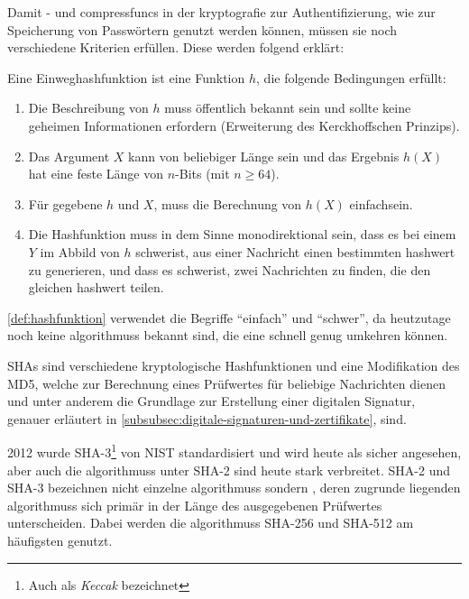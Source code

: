 Damit - und \glspl{compressfunc} in der \gls{kryptografie} zur Authentifizierung, wie \zb zur Speicherung von Passwörtern genutzt werden können, müssen sie noch verschiedene Kriterien erfüllen.
Diese werden folgend erklärt:

\begin{definition}[label=def:hashfunktion]
    Eine Einweghashfunktion ist eine Funktion $h$, die folgende Bedingungen erfüllt\autocite[\vglf][\pagef~17]{anal-des-hash-function-2003}:
    \begin{enumerate}
        \item Die Beschreibung von $h$ muss öffentlich bekannt sein und sollte keine geheimen Informationen erfordern (Erweiterung des Kerckhoff\textquotesingle schen Prinzips\autocite[]{petitcolas-information-nodate}).
        \item Das Argument $X$ kann von beliebiger Länge sein und das Ergebnis $h(X)$ hat eine feste Länge von $n$-Bits (mit $n \geq64$).
        \item Für gegebene $h$ und $X$, muss die Berechnung von $h(X)$ einfach\footnotemark sein.
        \item Die Hashfunktion muss in dem Sinne monodirektional sein, dass es bei einem $Y$ im Abbild von $h$ schwer\footnotemark[\value{footnote}] ist, aus einer Nachricht einen bestimmten \gls{hashwert} zu generieren, und dass es schwer\footnotemark[\value{footnote}] ist, zwei Nachrichten zu finden, die den gleichen \gls{hashwert} teilen.
    \end{enumerate}
\end{definition}

\autoref{def:hashfunktion} verwendet die Begriffe \enquote{einfach} und \enquote{schwer}, da heutzutage noch keine \glspl{algorithmus} bekannt sind, die eine  schnell genug umkehren können.\autocite[\pagef~234]{buchmann-einfuhrung-2016}

\acfp{SHA} sind verschiedene kryptologische Hashfunktionen und eine Modifikation des \gls{MD5}, welche zur Berechnung eines Prüfwertes für beliebige Nachrichten dienen und unter anderem die Grundlage zur Erstellung einer digitalen Signatur, genauer erläutert in \autoref{subsubsec:digitale-signaturen-und-zertifikate}, sind\autocite[]{WhatisSH81:online}.

2012 wurde \ac{SHA}-3\footnote{Auch als \textit{Keccak} bezeichnet}  von \ac{NIST} standardisiert und wird heute als sicher angesehen\autocite[\pagef~239]{buchmann-einfuhrung-2016}, aber auch die \glspl{algorithmus} unter \ac{SHA}-2 sind heute stark verbreitet.
\ac{SHA}-2 und \ac{SHA}-3 bezeichnen nicht einzelne \glspl{algorithmus} sondern , deren zugrunde liegenden \glspl{algorithmus} sich primär in der Länge des ausgegebenen Prüfwertes unterscheiden.
Dabei werden die \glspl{algorithmus} \ac{SHA}-256 und \ac{SHA}-512 am häufigsten genutzt.